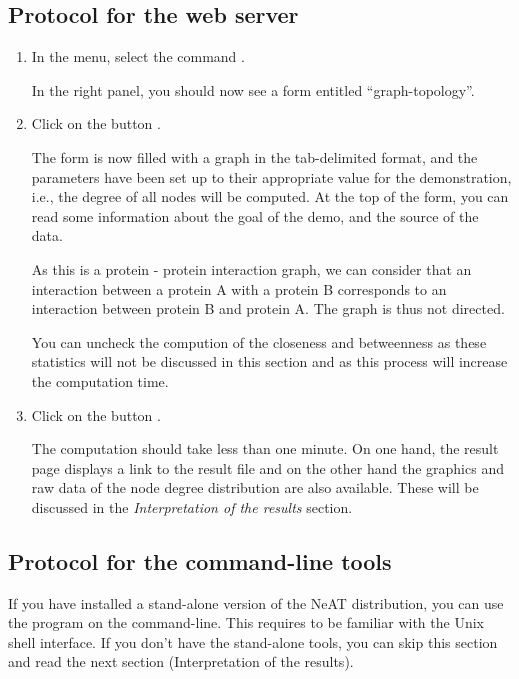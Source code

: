 \subsection{Protocol for the web server}

\begin{enumerate}

\item In the \neat menu, select the command . 

  In the right panel, you should now see a form entitled
  ``graph-topology''.

\item Click on the button . 

  The form is now filled with a graph in the tab-delimited format, and the parameters have been
  set up to their appropriate value for the demonstration, i.e., the degree of all nodes will be computed. 
  At the top of the form, you can read some information about the goal of the
  demo, and the source of the data.
  
  As this is a protein - protein interaction graph, we can consider that an interaction between a protein A with a 
  protein B corresponds to an interaction between protein B and protein A. The graph is thus not directed. 
  
  You can uncheck the compution of the closeness and betweenness as these statistics will not be discussed in this section and as this process will increase the computation time.

\item Click on the button . 

  The computation should take less than one minute. 
  On one hand, the result page displays a link to the result file and on the other hand the graphics and raw data of the node degree distribution are also available. These will be discussed in the \textit{Interpretation of the results} section.

\end{enumerate}

\subsection{Protocol for the command-line tools}

If you have installed a stand-alone version of the NeAT distribution,
you can use the program  on the
command-line. This requires to be familiar with the Unix shell
interface. If you don't have the stand-alone tools, you can skip this
section and read the next section (Interpretation of the results).

